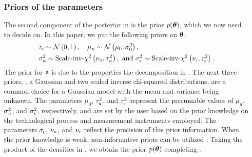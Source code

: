 \subsubsection{Priors of the parameters}
The second component of the posterior in  is the prior $\f{\vparam}$, which we now need to decide on. In this paper, we put the following priors on ${\boldsymbol\theta}$:
\begin{align}
  & \z_i \sim \gaussian{0}{1}, \hspace{1em} \mu_\u \sim \gaussian{\mu_0}{\sigma^2_0}, \elabel{priors} \\
  & \sigma^2_\u \sim \sichisquared{\nu_\u}{\tau^2_\u}, \text{ and } \sigma^2_\noise \sim \sichisquared{\nu_\noise}{\tau^2_\noise}. \nonumber
\end{align}
The prior for $\mathbf{z}$ is due to the properties the decomposition in .
The next three priors, \ie, a Gaussian and two scaled inverse chi-squared distributions, are a common choice for a Gaussian model with the mean and variance being unknown.
The parameters $\mu_0$, $\tau^2_u$, and $\tau^2_\epsilon$ represent the presumable values of $\mu_u$, $\sigma^2_u$, and $\sigma^2_\epsilon$, respectively, and are set by the user based on the prior knowledge on the technological process and measurement instruments employed. The parameters $\sigma_0$, $\nu_u$, and $\nu_\epsilon$ reflect the precision of this prior information.
When the prior knowledge is weak, non-informative priors can be utilized \cite{gelman2004}.
Taking the product of the densities in , we obtain the prior $\f{\vparam}$ completing .

